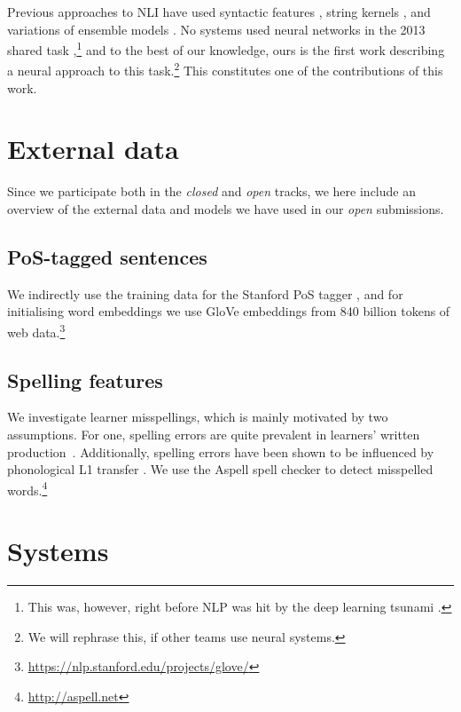 \documentclass[11pt,letterpaper]{article}
\begin{document}
Previous approaches to NLI have used syntactic features \citep{bykh:2014}, string kernels \citep{ionescu:2014}, and variations of ensemble models \citep{malmasi:2017:nlisg,nli2013}.
No systems used neural networks in the 2013 shared task \citep{nli2013},\footnote{This was, however, right before NLP was hit by the deep learning tsunami \citep{manning:2016}.} and to the best of our knowledge, ours is the first work describing a neural approach to this task.\footnote{We will rephrase this, if other teams use neural systems.}
This constitutes one of the contributions of this work.

\section{External data}

Since we participate both in the \textit{closed} and \textit{open} tracks, we here include an overview of the external data and models we have used in our \textit{open} submissions.

\subsection{PoS-tagged sentences}
We indirectly use the training data for the Stanford PoS tagger
\citep{Manning2014corenlp}, and for initialising word embeddings we use
GloVe embeddings from 840 billion tokens of web data.\footnote{\url{https://nlp.stanford.edu/projects/glove/}}

\subsection{Spelling features}
We investigate learner misspellings, which is mainly motivated by two assumptions.
For one, spelling errors are quite prevalent in learners' written production~\cite{kochmar2011}.
Additionally, spelling errors have been shown to be influenced by phonological L1 transfer \citep{grigonyte2014pronunciation}.
We use the Aspell spell checker to detect misspelled words.\footnote{\url{http://aspell.net}}

\section{Systems}
\end{document}

